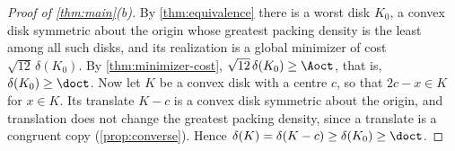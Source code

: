 \begin{proof}[Proof of \cref{thm:main}\textup{(b)}]
By \cref{thm:equivalence} there is a worst disk $K_0$, a convex disk symmetric about the origin
whose greatest packing density is the least among all such disks, and its realization is a global
minimizer of cost $\sqrt{12}\,\delta(K_0)$. By \cref{thm:minimizer-cost},
$\sqrt{12}\,\delta(K_0)\ge\Aoct$, that is, $\delta(K_0)\ge\doct$. Now let $K$ be a convex disk with
a centre $c$, so that $2c-x\in K$ for $x\in K$. Its translate $K-c$ is a convex disk symmetric
about the origin, and translation does not change the greatest packing density, since a translate
is a congruent copy (\cref{prop:converse}). Hence $\delta(K)=\delta(K-c)\ge\delta(K_0)\ge\doct$.
\end{proof}
